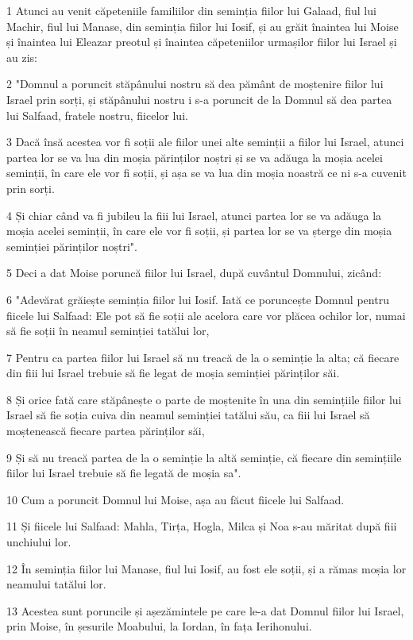 \par 1 Atunci au venit căpeteniile familiilor din seminția fiilor lui Galaad, fiul lui Machir, fiul lui Manase, din seminția fiilor lui Iosif, și au grăit înaintea lui Moise și înaintea lui Eleazar preotul și înaintea căpeteniilor urmașilor fiilor lui Israel și au zis:
\par 2 "Domnul a poruncit stăpânului nostru să dea pământ de moștenire fiilor lui Israel prin sorți, și stăpânului nostru i s-a poruncit de la Domnul să dea partea lui Salfaad, fratele nostru, fiicelor lui.
\par 3 Dacă însă acestea vor fi soții ale fiilor unei alte seminții a fiilor lui Israel, atunci partea lor se va lua din moșia părinților noștri și se va adăuga la moșia acelei seminții, în care ele vor fi soții, și așa se va lua din moșia noastră ce ni s-a cuvenit prin sorți.
\par 4 Și chiar când va fi jubileu la fiii lui Israel, atunci partea lor se va adăuga la moșia acelei seminții, în care ele vor fi soții, și partea lor se va șterge din moșia seminției părinților noștri".
\par 5 Deci a dat Moise poruncă fiilor lui Israel, după cuvântul Domnului, zicând:
\par 6 "Adevărat grăiește seminția fiilor lui Iosif. Iată ce poruncește Domnul pentru fiicele lui Salfaad: Ele pot să fie soții ale acelora care vor plăcea ochilor lor, numai să fie soții în neamul seminției tatălui lor,
\par 7 Pentru ca partea fiilor lui Israel să nu treacă de la o seminție la alta; că fiecare din fiii lui Israel trebuie să fie legat de moșia seminției părinților săi.
\par 8 Și orice fată care stăpânește o parte de moștenite în una din semințiile fiilor lui Israel să fie soția cuiva din neamul seminției tatălui său, ca fiii lui Israel să moștenească fiecare partea părinților săi,
\par 9 Și să nu treacă partea de la o seminție la altă seminție, că fiecare din semințiile fiilor lui Israel trebuie să fie legată de moșia sa".
\par 10 Cum a poruncit Domnul lui Moise, așa au făcut fiicele lui Salfaad.
\par 11 Și fiicele lui Salfaad: Mahla, Tirța, Hogla, Milca și Noa s-au măritat după fiii unchiului lor.
\par 12 În seminția fiilor lui Manase, fiul lui Iosif, au fost ele soții, și a rămas moșia lor neamului tatălui lor.
\par 13 Acestea sunt poruncile și așezămintele pe care le-a dat Domnul fiilor lui Israel, prin Moise, în șesurile Moabului, la Iordan, în fața Ierihonului.


